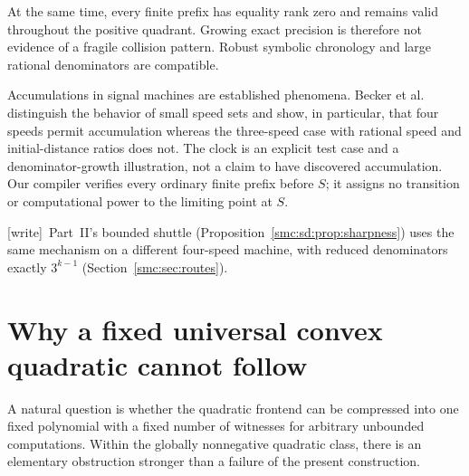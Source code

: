 \documentclass[11pt,letterpaper]{article}
\numberwithin{equation}{section}
\theoremstyle{definition}
\theoremstyle{remark}
\newcommand{\wtag}{\textup{[write]}}
\begin{document}
At the same time, every finite prefix has equality rank zero and remains
valid throughout the positive quadrant. Growing exact precision is therefore
not evidence of a fragile collision pattern. Robust symbolic chronology and
large rational denominators are compatible.

Accumulations in signal machines are established phenomena. Becker et
al.~\cite{accumulations} distinguish the behavior of small speed sets and
show, in particular, that four speeds permit accumulation whereas the
three-speed case with rational speed and initial-distance ratios does not.
The clock is an explicit test case and a denominator-growth illustration,
not a claim to have discovered accumulation. Our compiler verifies every
ordinary finite prefix before $S$; it assigns no transition or computational
power to the limiting point at $S$.


\wtag\ Part~II's bounded shuttle (Proposition~\ref{smc:sd:prop:sharpness}) uses the same mechanism on a different four-speed machine, with reduced denominators exactly $3^{k-1}$ (Section~\ref{smc:sec:routes}).

\section{Why a fixed universal convex quadratic cannot follow}
\label{smc:cg:sec:barrier}

A natural question is whether the quadratic frontend can be compressed into
one fixed polynomial with a fixed number of witnesses for arbitrary
unbounded computations. Within the globally nonnegative quadratic class,
there is an elementary obstruction stronger than a failure of the present
construction.
\end{document}
